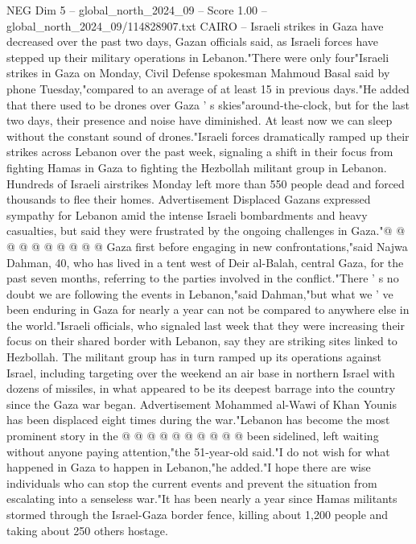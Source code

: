 \begin{textsample}{NEG Dim 5 – global\_north\_2024\_09 – Score 1.00 – global\_north\_2024\_09/114828907.txt}  \label{ex:f5_neg_093}
CAIRO -- Israeli strikes in Gaza have decreased over the past two days, Gazan officials said, as Israeli forces have stepped up their military operations in Lebanon."There were only four"Israeli strikes in Gaza on Monday, Civil Defense spokesman Mahmoud Basal said by phone Tuesday,"compared to an average of at least 15 in previous days."He added that there used to be drones over Gaza ' s skies"around-the-clock, but for the last two days, their presence and noise have diminished.
At least now we can sleep without the constant sound of drones."Israeli forces dramatically ramped up their strikes across Lebanon over the past week, signaling a shift in their focus from fighting Hamas in Gaza to fighting the Hezbollah militant group in Lebanon.
Hundreds of Israeli airstrikes Monday left more than 550 people dead and forced thousands to flee their homes.
Advertisement Displaced Gazans expressed sympathy for Lebanon amid the intense Israeli bombardments and heavy casualties, but said they were frustrated by the ongoing challenges in Gaza."@ @ @ @ @ @ @ @ @ @ Gaza first before engaging in new confrontations,"said Najwa Dahman, 40, who has lived in a tent west of Deir al-Balah, central Gaza, for the past seven months, referring to the parties involved in the conflict."There ' s no doubt we are following the events in Lebanon,"said Dahman,"but what we ' ve been enduring in Gaza for nearly a year can not be compared to anywhere else in the world."Israeli officials, who signaled last week that they were increasing their focus on their shared border with Lebanon, say they are striking sites linked to Hezbollah.
The militant group has in turn ramped up its operations against Israel, including targeting over the weekend an air base in northern Israel with dozens of missiles, in what appeared to be its deepest barrage into the country since the Gaza war began.
Advertisement Mohammed al-Wawi of Khan Younis has been displaced eight times during the war."Lebanon has become the most prominent story in the @ @ @ @ @ @ @ @ @ @ been sidelined, left waiting without anyone paying attention,"the 51-year-old said."I do not wish for what happened in Gaza to happen in Lebanon,"he added."I hope there are wise individuals who can stop the current events and prevent the situation from escalating into a senseless war."It has been nearly a year since Hamas militants stormed through the Israel-Gaza border fence, killing about 1,200 people and taking about 250 others hostage.

\end{textsample}
